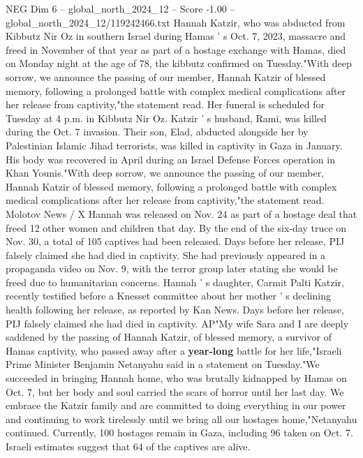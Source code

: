 \begin{textsample}{NEG Dim 6 – global\_north\_2024\_12 – Score -1.00 – global\_north\_2024\_12/119242466.txt}  \label{ex:f6_neg_187}
Hannah Katzir, who was abducted from Kibbutz Nir Oz in southern Israel during Hamas ' s Oct. 7, 2023, massacre and freed in November of that year as part of a hostage exchange with Hamas, died on Monday night at the age of 78, the kibbutz confirmed on Tuesday."With deep sorrow, we announce the passing of our member, Hannah Katzir of blessed memory, following a prolonged battle with complex medical complications after her release from captivity,"the statement read.
Her funeral is scheduled for Tuesday at 4 p.m. in Kibbutz Nir Oz.
Katzir ' s husband, Rami, was killed during the Oct. 7 invasion.
Their son, Elad, abducted alongside her by Palestinian Islamic Jihad terrorists, was killed in captivity in Gaza in January.
His body was recovered in April during an Israel Defense Forces operation in Khan Younis."With deep sorrow, we announce the passing of our member, Hannah Katzir of blessed memory, following a prolonged battle with complex medical complications after her release from captivity,"the statement read.
Molotov News / X Hannah was released on Nov. 24 as part of a hostage deal that freed 12 other women and children that day.
By the end of the six-day truce on Nov. 30, a total of 105 captives had been released.
Days before her release, PIJ falsely claimed she had died in captivity.
She had previously appeared in a propaganda video on Nov. 9, with the terror group later stating she would be freed due to humanitarian concerns.
Hannah ' s daughter, Carmit Palti Katzir, recently testified before a Knesset committee about her mother ' s declining health following her release, as reported by Kan News.
Days before her release, PIJ falsely claimed she had died in captivity.
AP"My wife Sara and I are deeply saddened by the passing of Hannah Katzir, of blessed memory, a survivor of Hamas captivity, who passed away after a \textbf{year-long} battle for her life,"Israeli Prime Minister Benjamin Netanyahu said in a statement on Tuesday."We succeeded in bringing Hannah home, who was brutally kidnapped by Hamas on Oct. 7, but her body and soul carried the scars of horror until her last day.
We embrace the Katzir family and are committed to doing everything in our power and continuing to work tirelessly until we bring all our hostages home,"Netanyahu continued.
Currently, 100 hostages remain in Gaza, including 96 taken on Oct. 7.
Israeli estimates suggest that 64 of the captives are alive.

\end{textsample}
